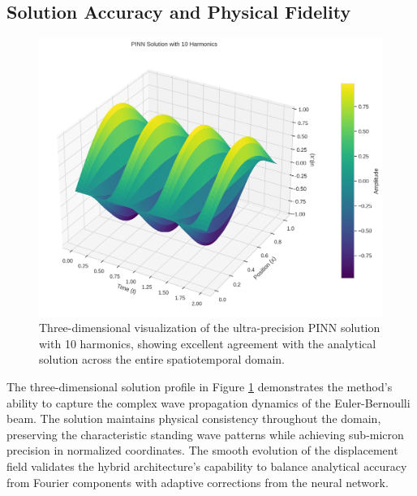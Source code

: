 \subsection{Solution Accuracy and Physical Fidelity}

\begin{figure}[ht]
    \centering
    \includegraphics[width = 1.0\linewidth]{figures/3d_comparison_pinn_solution_10h.png}
    \caption{Three-dimensional visualization of the ultra-precision PINN solution with 10 harmonics, showing excellent agreement with the analytical solution across the entire spatiotemporal domain.}
    \label{fig:3d_solution}
\end{figure}

The three-dimensional solution profile in Figure \ref{fig:3d_solution} demonstrates the method's ability to capture the complex wave propagation dynamics of the Euler-Bernoulli beam. The solution maintains physical consistency throughout the domain, preserving the characteristic standing wave patterns while achieving sub-micron precision in normalized coordinates. The smooth evolution of the displacement field validates the hybrid architecture's capability to balance analytical accuracy from Fourier components with adaptive corrections from the neural network.

